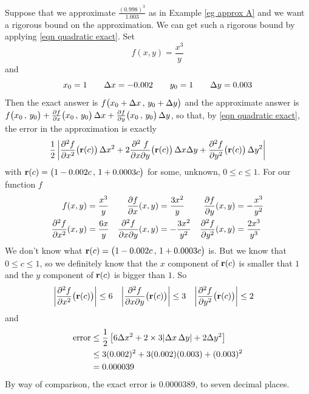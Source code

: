 \begin{eg}\label{eg error}
Suppose that we approximate
$\frac{(0.998)^3}{1.003}$ as in Example \ref{eg approx A}
 and we want a rigorous
bound on the approximation. We can get such a rigorous bound by 
applying \eqref{eqn quadratic exact}. Set 
\begin{equation*}
f(x,y)=\frac{x^3}{y}
\end{equation*}
and
\begin{equation*}
x_0=1\qquad 
\Delta x=-0.002\qquad
y_0=1\qquad
\Delta y=0.003
\end{equation*}
Then the exact answer is $f\big(x_0 + \Delta x\,,\,y_0+\Delta y\big)$
and the approximate answer is $f\big(x_0\,,\,y_0\big) 
       + \pdiff{f}{x}\big(x_0\,,\,y_0\big)\,\De x
       + \pdiff{f}{y}\big(x_0\,,\,y_0\big)\,\De y$,
so that, by \eqref{eqn quadratic exact}, the error in the
approximation is exactly
\begin{align*}
\frac{1}{2}\left|
        \frac{\partial^2 f}{\partial x^2}\big(\mathbf{r}(c)\big)\,\Delta x^2
       +2\frac{\partial^2\ f}{\partial x\partial y}
                                     \big(\mathbf{r}(c)\big) \,\Delta x\Delta y 
       + \frac{\partial^2 f}{\partial y^2}\big(\mathbf{r}(c)\big)\,\Delta y^2
       \right|
\end{align*}
with
   $\mathbf{r}(c) = \big(1-0.002 c\,,\,1+0.0003 c\big)$
for some, unknown, $0\le c\le 1$. For our function $f$
\begin{align*}
f(x,y)&=\frac{x^3}{y} &
\pdiff{f}{x}(x,y)&=\frac{3 x^2}{y} &
\pdiff{f}{y}(x,y)&=-\frac{x^3}{y^2} \\
\frac{\partial^2 f}{\partial x^2}(x,y)&=\frac{6 x}{y} &
\frac{\partial^2 f}{\partial x\partial y}(x,y)&=-\frac{3 x^2}{y^2} &
\frac{\partial^2 f}{\partial y^2}(x,y)&=\frac{2 x^3}{y^3} 
\end{align*}
We don't know what $\mathbf{r}(c)=\big(1-0.002 c\,,\,1+0.0003 c\big)$ is. 
But we know that $0\le c\le 1$, so we definitely know that the $x$ component
of $\mathbf{r}(c)$ is smaller that $1$ and the $y$ component of $\mathbf{r}(c)$ is bigger
than $1$. So
\begin{align*}
\left|\frac{\partial^2 f}{\partial x^2}\big(\mathbf{r}(c)\big)\right|&\le 6 &
\left|\frac{\partial^2 f}{\partial x\partial y}\big(\mathbf{r}(c)\big)\right|&\le 3 &
\left|\frac{\partial^2 f}{\partial y^2}\big(\mathbf{r}(c)\big)\right|&\le 2
\end{align*}
and
\begin{align*}
\text{error}
&\le \frac{1}{2}\left[6\Delta x^2  +2\times 3 |\Delta x\,\Delta y| +2\Delta y^2\right] \\
&\le 3(0.002)^2 + 3(0.002)(0.003) +(0.003)^2 \\
&= 0.000039
\end{align*}
By way of comparison, the exact error is 0.0000389, to seven decimal places.
\end{eg}

